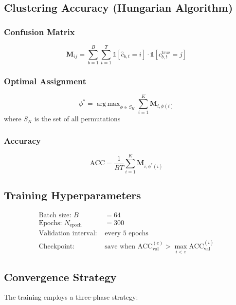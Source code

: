 \documentclass[11pt]{article}
\DeclareMathOperator*{\argmax}{arg\,max}
\begin{document}
\subsection{Clustering Accuracy (Hungarian Algorithm)}

\subsubsection{Confusion Matrix}
\begin{equation}
\mathbf{M}_{ij} = \sum_{b=1}^B \sum_{t=1}^T \mathbb{1}[\hat{c}_{b,t} = i] \cdot \mathbb{1}[c_{b,t}^{\text{true}} = j]
\end{equation}

\subsubsection{Optimal Assignment}
\begin{equation}
\phi^* = \argmax_{\phi \in S_K} \sum_{i=1}^K \mathbf{M}_{i,\phi(i)}
\end{equation}
where $S_K$ is the set of all permutations

\subsubsection{Accuracy}
\begin{equation}
\text{ACC} = \frac{1}{BT} \sum_{i=1}^K \mathbf{M}_{i,\phi^*(i)}
\end{equation}

\subsection{Training Hyperparameters}

\begin{align}
\text{Batch size: } B &= 64 \\
\text{Epochs: } N_{\text{epoch}} &= 300 \\
\text{Validation interval: } &\text{every 5 epochs} \\
\text{Checkpoint: } &\text{save when ACC}_{\text{val}}^{(e)} > \max_{i<e} \text{ACC}_{\text{val}}^{(i)}
\end{align}

\subsection{Convergence Strategy}

The training employs a three-phase strategy:
\end{document}
